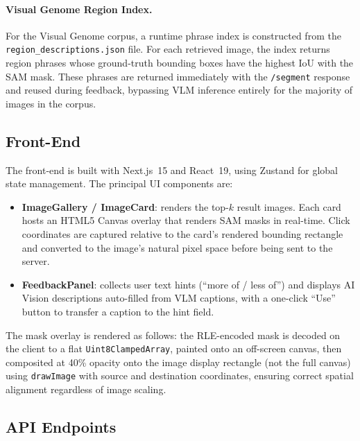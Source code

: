 \documentclass[12pt,a4paper]{article}
\begin{document}
\paragraph{Visual Genome Region Index.}
For the Visual Genome corpus, a runtime phrase index is constructed from the
\texttt{region\_descriptions.json} file. For each retrieved image, the
index returns region phrases whose ground-truth bounding boxes have the highest
IoU with the SAM mask. These phrases are returned immediately with the
\texttt{/segment} response and reused during feedback, bypassing VLM inference
entirely for the majority of images in the corpus.

\subsection{Front-End}

The front-end is built with Next.js~15 and React~19, using Zustand for global
state management. The principal UI components are:

\begin{itemize}[leftmargin=1.5em,noitemsep]
  \item \textbf{ImageGallery / ImageCard}: renders the top-$k$ result images.
        Each card hosts an HTML5 Canvas overlay that renders SAM masks in
        real-time. Click coordinates are captured relative to the card's
        rendered bounding rectangle and converted to the image's natural pixel
        space before being sent to the server.
  \item \textbf{FeedbackPanel}: collects user text hints (``more of / less of'')
        and displays AI Vision descriptions auto-filled from VLM captions,
        with a one-click ``Use'' button to transfer a caption to the hint field.
\end{itemize}

The mask overlay is rendered as follows: the RLE-encoded mask is decoded on the
client to a flat \texttt{Uint8ClampedArray}, painted onto an off-screen canvas,
then composited at 40\% opacity onto the image display rectangle (not the full
canvas) using \texttt{drawImage} with source and destination coordinates,
ensuring correct spatial alignment regardless of image scaling.

\subsection{API Endpoints}
\end{document}
